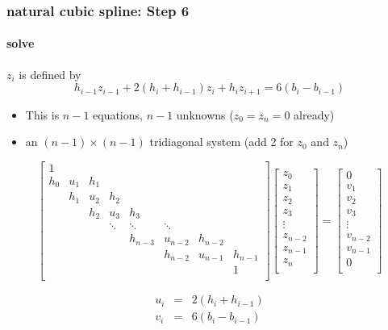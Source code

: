\documentclass[10pt]{beamer}
\begin{document}
\begin{frame}
\frametitle{natural cubic spline: Step 6}
\framesubtitle{solve}
$z_i$ is defined by
\begin{equation*}
  h_{i-1}z_{i-1} + 2(h_i+h_{i-1})z_i + h_{i}z_{i+1} = 6(b_i-b_{i-1})
\end{equation*}
\begin{itemize}
  \item This is $n-1$ equations, $n-1$ unknowns ($z_0=z_n=0$ already)
  \item an $(n-1)\times (n-1)$ tridiagonal system (add 2 for $z_0$ and $z_n$)
\end{itemize}
\[
\begin{bmatrix}
 1 &  & & & & & & \\ 
 h_0 & u_1  & h_1 & & & & & \\ 
 & h_1            &  u_2 & h_2 & & & & \\ 
 &                & h_2             & u_3 & h_3  & & & \\ 
 &                &                 & \ddots  & \ddots & \ddots & & \\  
 &  &   &   & h_{n-3} & u_{n-2} & h_{n-2}  & \\ 
 &  &   &   &         & h_{n-2} &  u_{n-1}& h_{n-1}\\
 &  &   &   &         &         &        & 1\\
\end{bmatrix}
\begin{bmatrix}
z_0\\z_1\\  z_2\\  z_3\\  \vdots\\  z_{n-2}\\  z_{n-1}\\z_n\\
\end{bmatrix}
 = 
\begin{bmatrix}
0\\v_1\\  v_2\\  v_3\\  \vdots\\  v_{n-2}\\  v_{n-1}\\0\\
\end{bmatrix}
\] 
 
\begin{eqnarray*}
u_i & = & 2 (h_i + h_{i-1} ) \\
v_i & = & 6(b_i - b_{i-1})
\end{eqnarray*} 
\end{frame}
\end{document}
